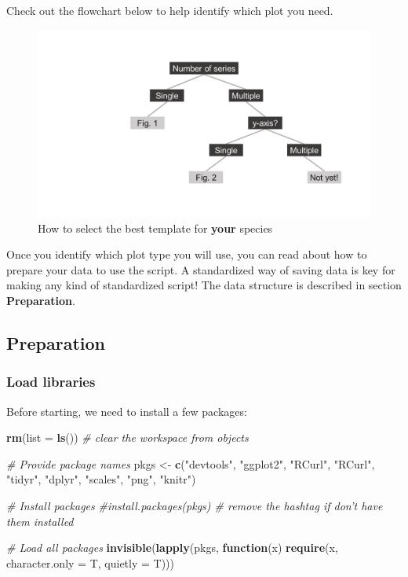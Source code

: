 \documentclass[]{article}
\newenvironment{Shaded}{\begin{snugshade}}{\end{snugshade}}
\newcommand{\KeywordTok}[1]{\textcolor[rgb]{0.13,0.29,0.53}{\textbf{#1}}}
\newcommand{\DataTypeTok}[1]{\textcolor[rgb]{0.13,0.29,0.53}{#1}}
\newcommand{\StringTok}[1]{\textcolor[rgb]{0.31,0.60,0.02}{#1}}
\newcommand{\CommentTok}[1]{\textcolor[rgb]{0.56,0.35,0.01}{\textit{#1}}}
\newcommand{\ControlFlowTok}[1]{\textcolor[rgb]{0.13,0.29,0.53}{\textbf{#1}}}
\newcommand{\NormalTok}[1]{#1}
\begin{document}
Check out the flowchart below to help identify which plot you need.

\begin{figure}
\centering
\includegraphics{Flow_chart.png}
\caption{How to select the best template for \textbf{your} species}
\end{figure}

Once you identify which plot type you will use, you can read about how
to prepare your data to use the script. A standardized way of saving
data is key for making any kind of standardized script! The data
structure is described in section \textbf{Preparation}.

\subsection{Preparation}\label{preparation}

\subsubsection{Load libraries}\label{load-libraries}

Before starting, we need to install a few packages:

\begin{Shaded}
\begin{Highlighting}[]
\KeywordTok{rm}\NormalTok{(}\DataTypeTok{list =} \KeywordTok{ls}\NormalTok{()) }\CommentTok{# clear the workspace from objects}

\CommentTok{# Provide package names}
\NormalTok{pkgs <-}\StringTok{ }\KeywordTok{c}\NormalTok{(}\StringTok{"devtools"}\NormalTok{, }
          \StringTok{"ggplot2"}\NormalTok{, }
          \StringTok{"RCurl"}\NormalTok{, }
          \StringTok{"RCurl"}\NormalTok{, }
          \StringTok{"tidyr"}\NormalTok{, }
          \StringTok{"dplyr"}\NormalTok{, }
          \StringTok{"scales"}\NormalTok{, }
          \StringTok{"png"}\NormalTok{, }
          \StringTok{"knitr"}\NormalTok{)}

\CommentTok{# Install packages}
\CommentTok{#install.packages(pkgs) # remove the hashtag if don't have them installed}

\CommentTok{# Load all packages}
\KeywordTok{invisible}\NormalTok{(}\KeywordTok{lapply}\NormalTok{(pkgs, }\ControlFlowTok{function}\NormalTok{(x) }\KeywordTok{require}\NormalTok{(x, }\DataTypeTok{character.only =}\NormalTok{ T, }\DataTypeTok{quietly =}\NormalTok{ T)))}
\end{Highlighting}
\end{Shaded}
\end{document}
